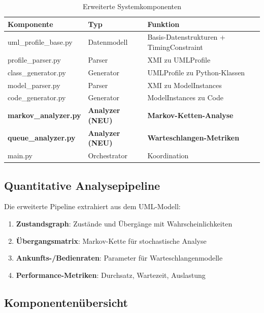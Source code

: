 ﻿\documentclass[a4paper,12pt]{scrreprt}
\theoremstyle{definition}
\begin{document}
\begin{table}[H]
	\centering
	\begin{tabular}{@{}llp{6cm}@{}}
		\toprule
		\textbf{Komponente} & \textbf{Typ} & \textbf{Funktion} \\
		\midrule
		uml\_profile\_base.py & Datenmodell & Basis-Datenstrukturen + TimingConstraint \\
		profile\_parser.py & Parser & XMI zu UMLProfile \\
		class\_generator.py & Generator & UMLProfile zu Python-Klassen \\
		model\_parser.py & Parser & XMI zu ModelInstances \\
		code\_generator.py & Generator & ModelInstances zu Code \\
		\textbf{markov\_analyzer.py} & \textbf{Analyzer (NEU)} & \textbf{Markov-Ketten-Analyse} \\
		\textbf{queue\_analyzer.py} & \textbf{Analyzer (NEU)} & \textbf{Warteschlangen-Metriken} \\
		main.py & Orchestrator & Koordination \\
		\bottomrule
	\end{tabular}
	\caption{Erweiterte Systemkomponenten}
	\label{tab:components-extended}
\end{table}

\subsection{Quantitative Analysepipeline}

Die erweiterte Pipeline extrahiert aus dem UML-Modell:

\begin{enumerate}
	\item[-] \textbf{Zustandsgraph}: Zustände und Übergänge mit Wahrscheinlichkeiten
	\item[-] \textbf{Übergangsmatrix}: Markov-Kette für stochastische Analyse
	\item[-] \textbf{Ankunfts-/Bedienraten}: Parameter für Warteschlangenmodelle
	\item[-] \textbf{Performance-Metriken}: Durchsatz, Wartezeit, Auslastung
\end{enumerate}

\subsection{Komponentenübersicht}
\end{document}
